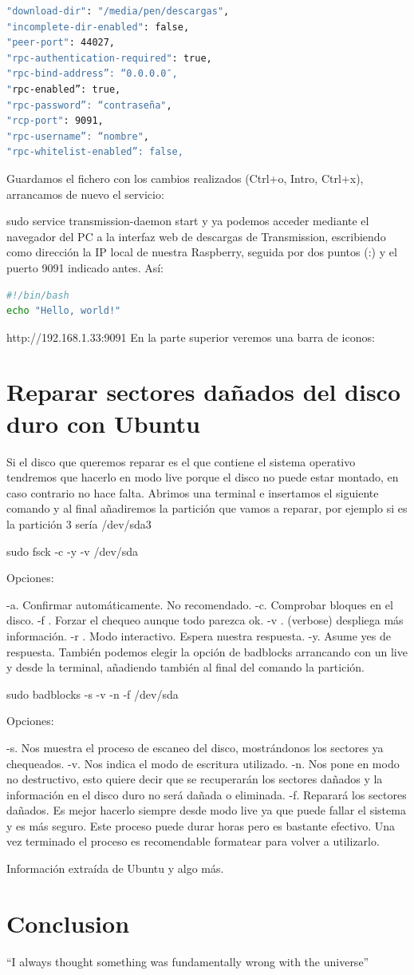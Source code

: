 \documentclass{article}
\begin{document}
\begin{lstlisting}[language=bash]
"download-dir": "/media/pen/descargas", 
"incomplete-dir-enabled": false, 
"peer-port": 44027, 
"rpc-authentication-required": true, 
"rpc-bind-address”: “0.0.0.0″, 
"rpc-enabled”: true, 
"rpc-password”: “contraseña", 
"rcp-port": 9091, 
"rpc-username”: “nombre", 
"rpc-whitelist-enabled”: false,
\end{lstlisting}

Guardamos el fichero con los cambios realizados (Ctrl+o, Intro, Ctrl+x), arrancamos de nuevo el servicio:

sudo service transmission-daemon start
y ya podemos acceder mediante el navegador del PC a la interfaz web de descargas de Transmission, escribiendo como dirección la IP local de nuestra Raspberry, seguida por dos puntos (:) y el puerto 9091 indicado antes. Así:

\begin{lstlisting}[language=bash,caption={bash version}]
#!/bin/bash
echo "Hello, world!"
\end{lstlisting}

http://192.168.1.33:9091
En la parte superior veremos una barra de iconos:

\section{Reparar sectores dañados del disco duro con Ubuntu}

Si el disco que queremos reparar es el que contiene el sistema operativo tendremos que hacerlo en modo live porque el disco no puede estar montado, en caso contrario no hace falta. Abrimos una terminal e insertamos el siguiente comando y al final añadiremos la partición que vamos a reparar, por ejemplo si es la partición 3 sería /dev/sda3

sudo fsck -c -y -v /dev/sda

Opciones:

-a. Confirmar automáticamente. No recomendado.
-c. Comprobar bloques en el disco.
-f . Forzar el chequeo aunque todo parezca ok.
-v . (verbose) despliega más información.
-r . Modo interactivo. Espera nuestra respuesta.
-y. Asume yes de respuesta.
También podemos elegir la opción de badblocks arrancando con un live y desde la terminal, añadiendo también al final del comando la partición.

sudo badblocks -s -v -n -f /dev/sda

Opciones:

-s. Nos muestra el proceso de escaneo del disco, mostrándonos los sectores ya chequeados.
-v. Nos indica el modo de escritura utilizado.
-n. Nos pone en modo no destructivo, esto quiere decir que se recuperarán los sectores dañados y la información en el disco duro no será dañada o eliminada.
-f. Reparará los sectores dañados.
Es mejor hacerlo siempre desde modo live ya que puede fallar el sistema y es más seguro. Este proceso puede durar horas pero es bastante efectivo. Una vez terminado el proceso es recomendable formatear para volver a utilizarlo.

Información extraída de Ubuntu y algo más.

\section{Conclusion}
``I always thought something was fundamentally wrong with the universe'' \citep{adams1995hitchhiker}



\end{document}
